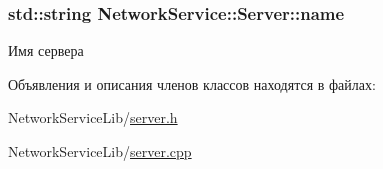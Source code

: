 \subsubsection[{name}]{\setlength{\rightskip}{0pt plus 5cm}std\+::string Network\+Service\+::\+Server\+::name\hspace{0.3cm}{\ttfamily [private]}}\label{class_network_service_1_1_server_aaab7735b4b5809169ecb92fa66f0bca7}


Имя сервера 



Объявления и описания членов классов находятся в файлах\+:\begin{DoxyCompactItemize}
\item 
Network\+Service\+Lib/\hyperlink{server_8h}{server.\+h}\item 
Network\+Service\+Lib/\hyperlink{server_8cpp}{server.\+cpp}\end{DoxyCompactItemize}
